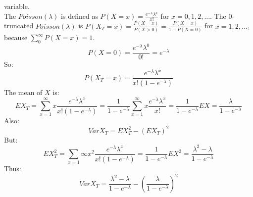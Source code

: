 \documentclass[a4paper]{article}
\begin{document}
\begin{enumerate}
  variable.\\
  The $Poisson(\lambda)$ is defined as
  $P(X=x)=\frac{e^{-\lambda}\lambda^x}{x!}$ for $x=0,1,2,\ldots$. The
  $0$-truncated $Poisson(\lambda)$ is
  $P(X_T=x)=\frac{P(X=x)}{P(X>0)}=\frac{P(X=x)}{1-P(X=0)}$ for $x=1,2,\ldots$,
  because $\sum_{0}^{\infty}P(X=x)=1$.
  $$P(X=0)=\frac{e^{-\lambda}\lambda^0}{0!}=e^{-\lambda}$$
  So:
  $$P(X_T=x)=\frac{e^{-\lambda}\lambda^x}{x!(1-e^{-\lambda})}$$
  The mean of $X$ is:
  $$EX_T=\sum_{x=1}^{\infty}x\frac{e^{-\lambda}\lambda^x}{x!(1-e^{-\lambda})}=\frac{1}{1-e^{-\lambda}}\sum_{x=1}^{\infty}x\frac{e^{-\lambda}\lambda^x}{x!}=\frac{1}{1-e^{-\lambda}}EX=\frac{\lambda}{1-e^{-\lambda}}$$
  Also:
  $$VarX_T=EX_T^2-(EX_T)^2$$
  But:
  $$EX_T^2=\sum_{x=1}{\infty}x^2\frac{e^{-\lambda}\lambda^x}{x!(1-e^{-\lambda})}=\frac{1}{1-e^{-\lambda}}EX^2=\frac{\lambda^2-\lambda}{1-e^{-\lambda}}$$
  Thus:
  $$VarX_T=\frac{\lambda^2-\lambda}{1-e^{-\lambda}}-(\frac{\lambda}{1-e^{-\lambda}})^2$$
\end{enumerate}
\end{document}
